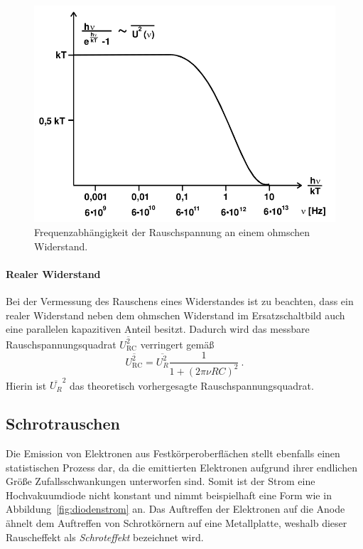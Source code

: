 \begin{figure}[!htpb]
  \centering
  \includegraphics[scale=0.3]{bilder/spannungsquadrat.png}
  \caption{Frequenzabhängigkeit der Rauschspannung an einem ohmschen
    Widerstand.}
\label{fig:spannungsquadrat}
\end{figure}

\paragraph{Realer Widerstand}
\label{par:realer_widerstand}

Bei der Vermessung des Rauschens eines Widerstandes ist zu beachten, dass ein
realer Widerstand neben dem ohmschen Widerstand im Ersatzschaltbild auch eine
parallelen kapazitiven Anteil besitzt.
Dadurch wird das messbare Rauschspannungsquadrat $\overline{U_\text{RC}^2}$
verringert gemäß
\begin{equation}
  \overline{U_\text{RC}^2} = \overline{U_R^2} \frac{1}{1 + {(2\pi\nu RC)}^2}~.
\end{equation}
Hierin ist $\overline{U_R}^2$ das theoretisch vorhergesagte
Rauschspannungsquadrat.


\subsection{Schrotrauschen}
\label{sub:schrotrauschen}

Die Emission von Elektronen aus Festkörperoberflächen stellt ebenfalls einen
statistischen Prozess dar, da die emittierten Elektronen aufgrund ihrer
endlichen Größe Zufallsschwankungen unterworfen sind.
Somit ist der Strom eine Hochvakuumdiode nicht konstant und nimmt beispielhaft
eine Form wie in Abbildung~\ref{fig:diodenstrom} an.
Das Auftreffen der Elektronen auf die Anode ähnelt dem Auftreffen von
Schrotkörnern auf eine Metallplatte, weshalb dieser Rauscheffekt als
\emph{Schroteffekt} bezeichnet wird.

